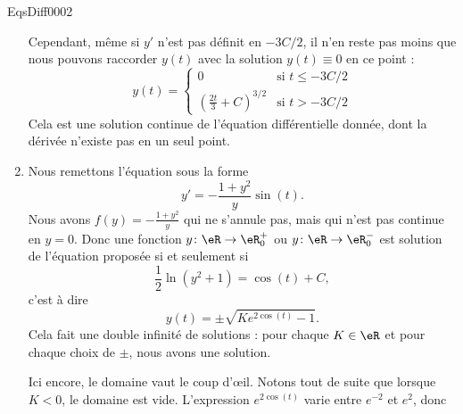 \begin{corrige}{EqsDiff0002}
\begin{enumerate}
Cependant, même si $y'$ n'est pas définit en $-3C/2$, il n'en reste pas moins que nous pouvons raccorder $y(t)$ avec la solution $y(t)\equiv 0$ en ce point :
\begin{equation}
	y(t)=\begin{cases}
	0	&					\text{si }t\leq -3C/2\\
	\left( \frac{ 2t }{ 3 }+C \right)^{3/2}	&	\text{si }t>-3C/2
\end{cases}
\end{equation}
Cela est une solution continue de l'équation différentielle donnée, dont la dérivée n'existe pas en un seul point.

\item
Nous remettons l'équation sous la forme
\begin{equation}
	y'=-\frac{ 1+y^2 }{ y }\sin(t).
\end{equation}
Nous avons $f(y)=-\frac{ 1+y^2 }{ y }$ qui ne s'annule pas, mais qui n'est pas continue en $y=0$. Donc une fonction $y\colon \eR\to \eR^+_0$ ou $y\colon \eR\to \eR^-_0$ est solution de l'équation proposée si et seulement si
\begin{equation}
	\frac{ 1 }{2}\ln(y^2+1)=\cos(t)+C,
\end{equation}
c'est à dire
\begin{equation}		\label{EqSolGeneRacExpCis}
	y(t)=\pm\sqrt{K e^{2\cos(t)}-1}.
\end{equation}
Cela fait une double infinité de solutions : pour chaque $K\in\eR$ et pour chaque choix de $\pm$, nous avons une solution.

Ici encore, le domaine vaut le coup d'œil. Notons tout de suite que lorsque $K<0$, le domaine est vide. L'expression $ e^{2\cos(t)}$ varie entre $e^{-2}$ et $e^2$, donc
\begin{enumerate}


\end{enumerate}
\end{enumerate}
\end{corrige}
